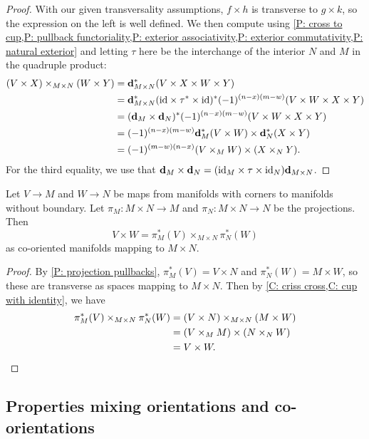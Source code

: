 \begin{proof}
	With our given transversality assumptions, $f \times h$ is transverse to $g \times k$, so the expression on the left is well defined.
	We then compute using \cref{P: cross to cup,P: pullback functoriality,P: exterior associativity,P: exterior commutativity,P: natural exterior} and letting $\tau$ here be the interchange of the interior $N$ and $M$ in the quadruple product:
	\begin{align*}
		(V \times X)\times_{M \times N} (W \times Y)& = \mathbf{d}_{M \times N}^*(V \times X \times W \times Y)\\
		& = \mathbf{d}_{M \times N}^*(\mathrm{id} \times \tau^* \times \mathrm{id})^*(-1)^{(n-x)(m-w)}(V \times W \times X \times Y)\\
		& = (\mathbf{d}_M \times \mathbf{d}_N)^*(-1)^{(n-x)(m-w)}(V \times W \times X \times Y)\\
		& = (-1)^{(n-x)(m-w)}\mathbf{d}_M^*(V \times W) \times \mathbf{d}_N^*( X \times Y)\\
		& = (-1)^{(m-w)(n-x)} (V \times_M W) \times (X \times_N Y).
	\end{align*}
	For the third equality, we use that $\mathbf{d}_M \times \mathbf{d}_N = (\mathrm{id}_M \times \tau \times \mathrm{id}_N)\mathbf{d}_{M \times N}$.
\end{proof}

\begin{corollary}\label{C: cross is cup}
	Let $V \to M$ and $W \to N$ be maps from manifolds with corners to manifolds without boundary.
	Let $\pi_M \colon M \times N \to M$ and $\pi_N \colon M \times N \to N$ be the projections.
	Then $$V \times W = \pi_M^*(V)\times_{M \times N}\pi_N^*(W)$$ as co-oriented manifolds mapping to $M \times N$.
\end{corollary}

\begin{proof}
	By \cref{P: projection pullbacks}, $\pi_M^*(V) = V \times N$ and $\pi_N^*(W) = M \times W$, so these are transverse as spaces mapping to $M \times N$.
	Then by \cref{C: criss cross,C: cup with identity}, we have
	\begin{align*}
		\pi_M^*(V)\times_{M \times N}\pi_N^*(W)& = (V \times N)\times_{M \times N} (M \times W)\\
		& = (V \times_M M) \times (N \times_N W)\\
		& = V \times W.\qedhere
	\end{align*}
\end{proof}

\subsection{Properties mixing orientations and co-orientations}\label{S: mixing}

